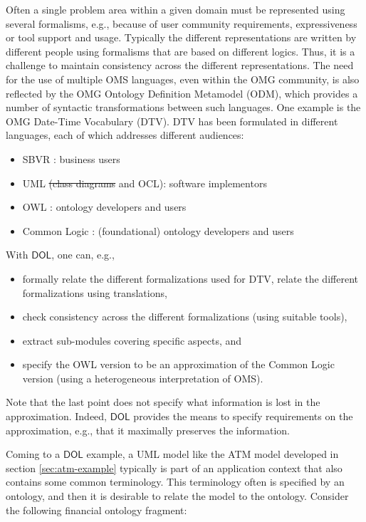 \documentclass[10pt,fleqn,final]{scrreprt}
\newcommand*{\DOL}{\ensuremath{\mathsf{DOL}}\xspace}
\newcommand{\noterefname}{note}
\newcommand{\nref}[1]{\noterefname~\ref{#1}}
\renewcommand{\nref}[1]{\ref{nref-#1}} %
\providecommand{\DIFadd}[1]{{\protect\color{blue}\uwave{#1}}} %
\providecommand{\DIFdel}[1]{{\protect\color{red}\sout{#1}}}                      %
\providecommand{\DIFaddbegin}{} %
\providecommand{\DIFaddend}{} %
\providecommand{\DIFdelbegin}{} %
\providecommand{\DIFdelend}{} %
\begin{document}
Often a single problem area within a given domain must be represented using several formalisms, e.g., because of user community requirements, expressiveness or tool support 
and usage. 
Typically the different representations are written by different people using formalisms that are based on different logics. Thus, it is a challenge to maintain 
consistency across the different representations. 
The need for the use of multiple OMS languages, even within the OMG community, is also reflected by the OMG Ontology Definition Metamodel (ODM\DIFaddbegin \DIFadd{, \nref{ODM}}\DIFaddend ), which 
provides a number of syntactic transformations between such languages.
One example is the OMG Date-Time Vocabulary (DTV\DIFaddbegin \DIFadd{, \nref{DTV}}\DIFaddend ). DTV has been formulated in different languages, each of which addresses different audiences:
\begin{itemize}
\item	 SBVR \DIFaddbegin \DIFadd{\nref{SBVR}}\DIFaddend : business users
\item 	UML \DIFdelbegin \DIFdel{(class diagrams }\DIFdelend \DIFaddbegin \DIFadd{\nref{UML} (class models }\DIFaddend and OCL): software implementors
\item 	OWL \DIFaddbegin \DIFadd{\nref{OWL2}}\DIFaddend : ontology developers and users
\item 	Common Logic \DIFaddbegin \DIFadd{\nref{CL}}\DIFaddend : (foundational) ontology developers and users
\end{itemize}
With \DOL, one can, e.g.,
\begin{itemize}
\item 	formally relate the different formalizations used for DTV, relate the different formalizations using translations,
\item 	check consistency across the different formalizations (using suitable tools),
\item 	extract sub-modules covering specific aspects, and
\item 	specify the OWL version to be an approximation of the Common Logic version (using a heterogeneous interpretation of OMS).
\end{itemize}
Note that the last point does not specify what information is lost in the approximation. Indeed, \DOL provides the means to specify requirements on the approximation, e.g., that it maximally preserves the information. 

Coming to a \DOL example,
a UML model like the ATM model developed in section \ref{sec:atm-example} typically is part of an
application context that also contains some common terminology.
This terminology often is specified by an ontology, and then
it is desirable to relate the model to the ontology. Consider
the following financial ontology fragment:
\end{document}
